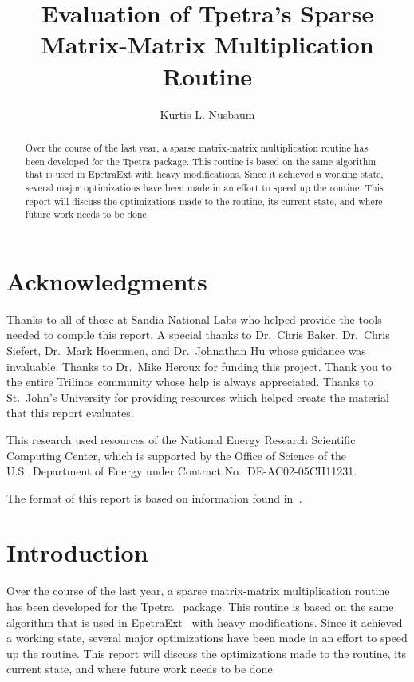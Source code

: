 \documentclass[pdf,12pt]{SANDreport}
\title{Evaluation of Tpetra's Sparse Matrix-Matrix Multiplication Routine}
\author{Kurtis L. Nusbaum}
\date{}
\begin{document}
\VerbatimFootnotes

\maketitle

\begin{abstract}
Over the course of the last year, a sparse matrix-matrix multiplication routine has been developed for the Tpetra package.
This routine is based on the same algorithm that is used in EpetraExt with heavy modifications. Since it 
achieved a working state, several major optimizations have been made in an effort to speed up the routine. This report will
discuss the optimizations made to the routine, its current state, and where future work needs to be done.
\end{abstract}
\clearpage
\section*{Acknowledgments}
Thanks to all of those at Sandia National Labs who helped provide the tools needed to compile this report. 
A special thanks to Dr.\ Chris Baker, Dr.\ Chris 
Siefert, Dr.\ Mark Hoemmen, and Dr.\ Johnathan Hu whose guidance was invaluable. Thanks to Dr.\ Mike Heroux for funding this 
project. Thank you to the entire Trilinos community whose help is always appreciated. Thanks to St.\ John's University
for providing resources which helped create the material that this report evaluates. 

This research used resources of the National Energy Research Scientific Computing Center, which is supported by the
Office of Science of the U.S.\ Department of Energy under Contract No.\ DE-AC02-05CH11231.

The format of this report is based on information found in~\cite{Sand98-0730}.
\cleardoublepage
\tableofcontents
\listoffigures
\listoftables
\clearpage

\SANDmain
\section{Introduction}
Over the course of the last year, a sparse matrix-matrix multiplication routine has been developed for the 
Tpetra~\cite{TpetraHomePage}
package. This routine is based on the same algorithm that is used in EpetraExt~\cite{EpetraExtHomePage} 
with heavy modifications. Since it achieved a working state, several major optimizations have been made in an 
effort to speed up the routine. This report will
discuss the optimizations made to the routine, its current state, and where future work needs to be done.
\end{document}
